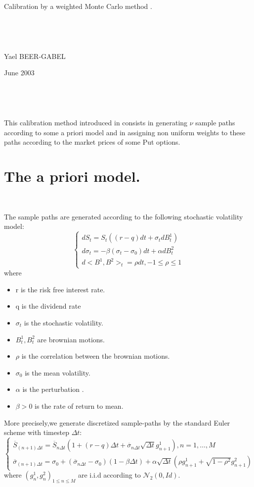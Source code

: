 \documentclass[a4paper,12pt]{article}
\begin{document}
\begin{center}
{\Large Calibration by a weighted Monte Carlo method .}

\


\

\Large Yael BEER-GABEL

\Large June 2003
\end{center}
\

\

This calibration method introduced in \cite{ABFGKN} consists in generating
$\nu$ sample paths according to some a priori model and in assigning non
uniform weights to these paths according to the market prices of some
Put options.



\section*{The a priori model.}

\

The sample paths are generated according to the following stochastic
volatility model:
\begin{equation*}
\begin{cases}
dS_t=S_t((r-q) dt+\sigma_t dB^1_t)\\
d\sigma_t=-\beta (\sigma_t - \sigma_0) dt + \alpha dB^2_t \\
d<B^1,B^2>_t =\rho dt, -1\leq \rho \leq 1
\end{cases}
\end{equation*}
where
\begin{itemize}
\item{r is the risk free interest rate.}
\item{q is the dividend rate}
\item{$\sigma_t$ is the stochastic volatility.}
\item{$B^1_t,B^2_t$ are  brownian motions.}
\item{$\rho$ is the correlation between the brownian motions.}
\item{$\sigma_0$ is the mean volatility.}
\item{$\alpha$ is the perturbation .}
\item{$\beta>0$ is the rate of return to mean.}
\end{itemize}
More precisely,we generate discretized sample-paths by the standard
Euler scheme with timestep $\Delta t$:
\begin{equation}
\begin{cases}
\overline{S}_{(n+1)\Delta t} =  \overline{S}_{n\Delta
t}(1+(r-q)\Delta t +\overline{\sigma}_{n\Delta
  t}\sqrt{\Delta t}g^1_{n+1}) , n=1,\hdots,M\\
\overline{\sigma}_{(n+1)\Delta t}= \sigma_0+
(\overline{\sigma}_{n\Delta t}-\sigma_0)(1- \beta \Delta t)+
\alpha \sqrt{\Delta t}(\rho g^1_{n+1}+\sqrt{1-\rho^2} g^2_{n+1})
\end{cases}
\end{equation}
where $(g^1_{n},g^2_{n})_{1\leq n \leq M}$ are i.i.d according to
$\mathcal{N}_{2}(0,Id)$.
\end{document}
